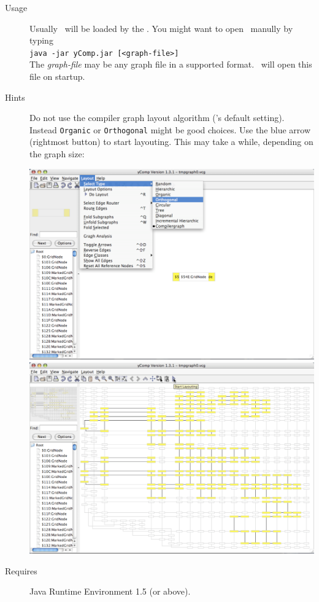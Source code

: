 \begin{description}
  \item[Usage] Usually \yComp\ will be loaded by the \GrShell. You might want to open \yComp\ manully by typing\\
   \texttt{java -jar yComp.jar [<graph-file>]}\\
  The \emph{graph-file} may be any graph file in a supported format. \yComp\ will open this file on startup.
  \item[Hints] Do not use the compiler graph layout algorithm (\yComp's default setting). Instead \texttt{Organic} or \texttt{Orthogonal} might be good choices. Use the blue arrow (rightmost button) to start layouting. This may take a while, depending on the graph size:
\begin{center}
\includegraphics[width=0.45\linewidth]{fig/ycomp1.pdf} \includegraphics[width=0.45\linewidth]{fig/ycomp2.pdf}
\end{center}
  \item[Requires] Java Runtime Environment 1.5 (or above).
\end{description}

